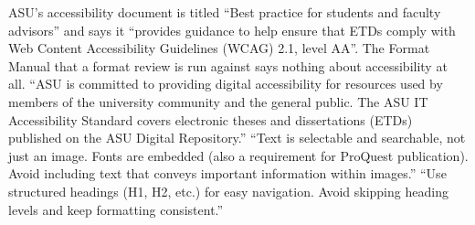 %
%
%
	{ASU's accessibility document is titled ``Best practice for students and
	 faculty advisors'' and says it ``provides guidance to help ensure that ETDs
	 comply with Web Content Accessibility Guidelines (WCAG) 2.1, level AA''.
	 The Format Manual that a format review is run against says nothing about
	 accessibility at all.}
	{``ASU is committed to providing digital accessibility for resources used by
	 members of the university community and the general public. The ASU IT
	 Accessibility Standard covers electronic theses and dissertations (ETDs)
	 published on the ASU Digital Repository.''}
	{``Text is selectable and searchable, not just an image. Fonts are embedded
	 (also a requirement for ProQuest publication). Avoid including text that
	 conveys important information within images.''}
	{``Use structured headings (H1, H2, etc.) for easy navigation. Avoid
	 skipping heading levels and keep formatting consistent.''}
